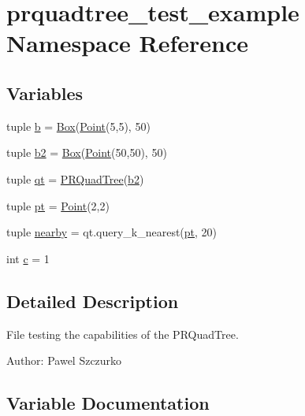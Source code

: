 \hypertarget{namespaceprquadtree__test__example}{}\section{prquadtree\+\_\+test\+\_\+example Namespace Reference}
\label{namespaceprquadtree__test__example}
\subsection*{Variables}
\begin{DoxyCompactItemize}
\item 
tuple \hyperlink{namespaceprquadtree__test__example_a430c6e4c1960cb0326d40a60be817d65}{b} = \hyperlink{classprquadtree_1_1Box}{Box}(\hyperlink{classprquadtree_1_1Point}{Point}(5,5), 50)
\item 
tuple \hyperlink{namespaceprquadtree__test__example_a6c76891a5f566a70e8ab91c9946be5a2}{b2} = \hyperlink{classprquadtree_1_1Box}{Box}(\hyperlink{classprquadtree_1_1Point}{Point}(50,50), 50)
\item 
tuple \hyperlink{namespaceprquadtree__test__example_a92699a8bb92121b0ffdac66d511f3359}{qt} = \hyperlink{classprquadtree_1_1PRQuadTree}{P\+R\+Quad\+Tree}(\hyperlink{namespaceprquadtree__test__example_a6c76891a5f566a70e8ab91c9946be5a2}{b2})
\item 
tuple \hyperlink{namespaceprquadtree__test__example_ab0091dbc0243fa027e0bc7025d8ea3ad}{pt} = \hyperlink{classprquadtree_1_1Point}{Point}(2,2)
\item 
tuple \hyperlink{namespaceprquadtree__test__example_a2024920106d8770dc2cfa9da1e4fe410}{nearby} = qt.\+query\+\_\+k\+\_\+nearest(\hyperlink{namespaceprquadtree__test__example_ab0091dbc0243fa027e0bc7025d8ea3ad}{pt}, 20)
\item 
int \hyperlink{namespaceprquadtree__test__example_a51f7199631c374c21ed3dada86cc3766}{c} = 1
\end{DoxyCompactItemize}


\subsection{Detailed Description}
\begin{DoxyVerb}File testing the capabilities of the PRQuadTree.

Author: Pawel Szczurko
\end{DoxyVerb}
 

\subsection{Variable Documentation}
\hypertarget{namespaceprquadtree__test__example_a430c6e4c1960cb0326d40a60be817d65}{}
